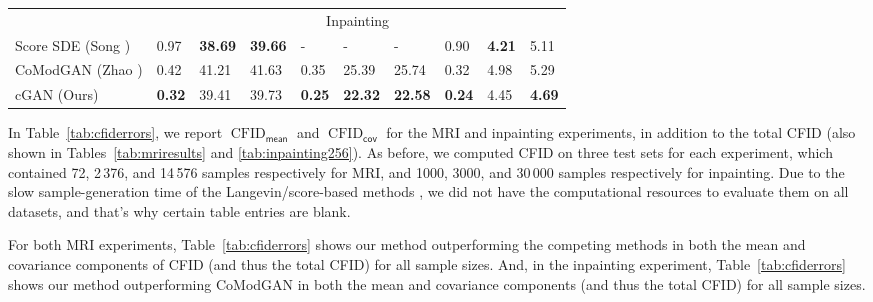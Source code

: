 \documentclass{article}
\theoremstyle{plain}
\theoremstyle{definition}
\theoremstyle{remark}
\newcommand{\tabref}[1]{Table~\ref{tab:#1}}
\DeclareMathOperator{\CFID}{CFID}
\newcommand{\mean}{_{\mathsf{mean}}}
\newcommand{\cova}{_{\mathsf{cov}}}
\begin{document}
\begin{table}[t]
{\begin{tabular}{llllllllll}
    & \multicolumn{9}{c}{Inpainting} \\ \cmidrule(r){2-10}
    Score SDE (Song \cite{Song:ICLR:21}) & 0.97 & \bf 38.69 & \bf 39.66 & -    & -     & - & 0.90 & \bf 4.21 & 5.11\\
    CoModGAN (Zhao \cite{Zhao:ICLR:21})    & 0.42 & 41.21     & 41.63     & 0.35 & 25.39 & 25.74 & 0.32 & 4.98 & 5.29\\
    cGAN (Ours) & \bf 0.32 & 39.41 & 39.73 & \bf 0.25 & \bf 22.32 & \bf 22.58 & \bf 0.24 & 4.45 & \bf 4.69\\
    \bottomrule
  \end{tabular}%
  }
\end{table}

In \tabref{cfiderrors}, we report $\CFID\mean$ and $\CFID\cova$ for the MRI and inpainting experiments, in addition to the total CFID (also shown in Tables~\ref{tab:mriresults} and \ref{tab:inpainting256}).
As before, we computed CFID on three test sets for each experiment, 
which contained 72, 2\,376, and 14\,576 samples respectively for MRI, and 
1000, 3000, and 30\,000 samples respectively for inpainting. 
Due to the slow sample-generation time of the Langevin/score-based methods \cite{Jalal:NIPS:21,Song:ICLR:21}, we did not have the computational resources to evaluate them on all datasets, and that's why certain table entries are blank.

For both MRI experiments, \tabref{cfiderrors} shows our method outperforming the competing methods in both the mean and covariance components of CFID (and thus the total CFID) for all sample sizes.
And, in the inpainting experiment, \tabref{cfiderrors} shows our method outperforming CoModGAN in both the mean and covariance components (and thus the total CFID) for all sample sizes.
\end{document}
